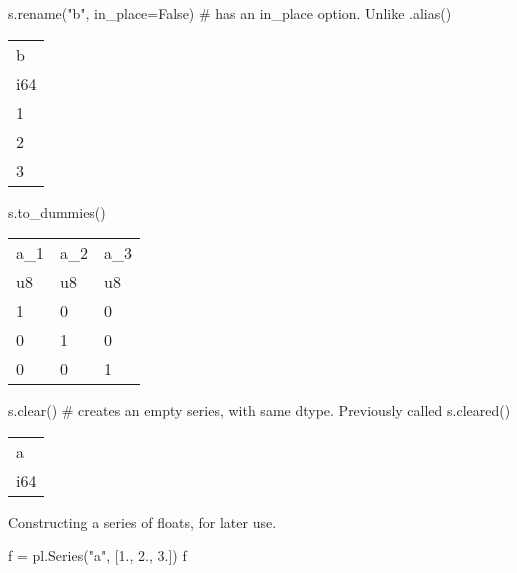 \documentclass[
  letterpaper,
  DIV=11,
  numbers=noendperiod]{scrartcl}
\newenvironment{Shaded}{\begin{snugshade}}{\end{snugshade}}
\newcommand{\CommentTok}[1]{\textcolor[rgb]{0.37,0.37,0.37}{#1}}
\newcommand{\FloatTok}[1]{\textcolor[rgb]{0.68,0.00,0.00}{#1}}
\newcommand{\NormalTok}[1]{\textcolor[rgb]{0.00,0.23,0.31}{#1}}
\newcommand{\OperatorTok}[1]{\textcolor[rgb]{0.37,0.37,0.37}{#1}}
\newcommand{\StringTok}[1]{\textcolor[rgb]{0.13,0.47,0.30}{#1}}
\newcommand{\VariableTok}[1]{\textcolor[rgb]{0.07,0.07,0.07}{#1}}
\begin{document}
\begin{Shaded}
\begin{Highlighting}[]
\NormalTok{s.rename(}\StringTok{"b"}\NormalTok{, in\_place}\OperatorTok{=}\VariableTok{False}\NormalTok{) }\CommentTok{\# has an in\_place option. Unlike .alias()}
\end{Highlighting}
\end{Shaded}

\begin{longtable}[]{@{}l@{}}
\toprule()
b \\
i64 \\
\midrule()
\endhead
1 \\
2 \\
3 \\
\bottomrule()
\end{longtable}

\begin{Shaded}
\begin{Highlighting}[]
\NormalTok{s.to\_dummies()}
\end{Highlighting}
\end{Shaded}

\begin{longtable}[]{@{}lll@{}}
\toprule()
a\_1 & a\_2 & a\_3 \\
u8 & u8 & u8 \\
\midrule()
\endhead
1 & 0 & 0 \\
0 & 1 & 0 \\
0 & 0 & 1 \\
\bottomrule()
\end{longtable}

\begin{Shaded}
\begin{Highlighting}[]
\NormalTok{s.clear() }\CommentTok{\# creates an empty series, with same dtype. Previously called s.cleared()}
\end{Highlighting}
\end{Shaded}

\begin{longtable}[]{@{}l@{}}
\toprule()
a \\
i64 \\
\midrule()
\endhead
\bottomrule()
\end{longtable}

Constructing a series of floats, for later use.

\begin{Shaded}
\begin{Highlighting}[]
\NormalTok{f }\OperatorTok{=}\NormalTok{ pl.Series(}\StringTok{"a"}\NormalTok{, [}\FloatTok{1.}\NormalTok{, }\FloatTok{2.}\NormalTok{, }\FloatTok{3.}\NormalTok{])}
\NormalTok{f}
\end{Highlighting}
\end{Shaded}
\end{document}
